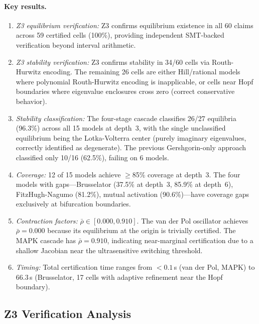 \documentclass[11pt]{article}
\begin{document}
\paragraph{Key results.}
\begin{enumerate}[leftmargin=*]
\item \emph{Z3 equilibrium verification:} Z3 confirms equilibrium existence in all 60 claims across 59 certified cells (100\%), providing independent SMT-backed verification beyond interval arithmetic.

\item \emph{Z3 stability verification:} Z3 confirms stability in 34/60 cells via Routh-Hurwitz encoding.  The remaining 26 cells are either Hill/rational models where polynomial Routh-Hurwitz encoding is inapplicable, or cells near Hopf boundaries where eigenvalue enclosures cross zero (correct conservative behavior).

\item \emph{Stability classification:} The four-stage cascade classifies 26/27 equilibria (96.3\%) across all 15 models at depth~3, with the single unclassified equilibrium being the Lotka-Volterra center (purely imaginary eigenvalues, correctly identified as degenerate).  The previous Gershgorin-only approach classified only 10/16 (62.5\%), failing on 6 models.

\item \emph{Coverage:} 12 of 15 models achieve $\geq$85\% coverage at depth~3.  The four models with gaps---Brusselator (37.5\% at depth~3, 85.9\% at depth~6), FitzHugh-Nagumo (81.2\%), mutual activation (90.6\%)---have coverage gaps exclusively at bifurcation boundaries.

\item \emph{Contraction factors:} $\bar\rho \in [0.000, 0.910]$.  The van der Pol oscillator achieves $\bar\rho = 0.000$ because its equilibrium at the origin is trivially certified.  The MAPK cascade has $\bar\rho = 0.910$, indicating near-marginal certification due to a shallow Jacobian near the ultrasensitive switching threshold.

\item \emph{Timing:} Total certification time ranges from ${<}0.1$\,s (van der Pol, MAPK) to 66.3\,s (Brusselator, 17 cells with adaptive refinement near the Hopf boundary).
\end{enumerate}

\subsection{Z3 Verification Analysis}
\end{document}

